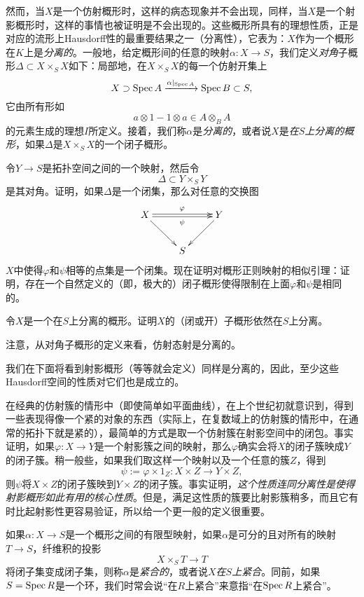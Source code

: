 然而，当$X$是一个仿射概形时，这样的病态现象并不会出现，同样，当$X$是一个射影概形时，这样的事情也被证明是不会出现的。这些概形所具有的理想性质，正是对应的流形上Hausdorff性的最重要结果之一（分离性），它表为：$X$作为一个概形在$K$上是\textit{分离的}。一般地，给定概形间的任意的映射$\alpha:X\to S$，我们定义\textit{对角}子概形$\Delta\subset X\times_S X$如下：局部地，在$X\times_S X$的每一个仿射开集上
\[
	X\supset \operatorname{Spec} A\xrightarrow{\alpha|_{\operatorname{Spec} A}}\operatorname{Spec} B\subset S,
\]
它由所有形如
\[
a\otimes 1 - 1\otimes a \in A\otimes_B A
\]
的元素生成的理想$I$所定义。接着，我们称$\alpha$是\textit{分离的}，或者说$X$是\textit{在$S$上分离的概形}，如果$\Delta$是$X\times_S X$的一个闭子概形。

\begin{exe}
令$Y\to S$是拓扑空间之间的一个映射，然后令
\[
	\Delta \subset Y\times_S Y
\]
是其对角。证明，如果$\Delta$是一个闭集，那么对任意的交换图
\[
	\xymatrix{
		X\ar@<0.3ex>[rr]^\varphi \ar@<-0.3ex>[rr]_\psi\ar[dr] &&Y\ar[ld]\\
		&S&
	}
\]
$X$中使得$\varphi$和$\psi$相等的点集是一个闭集。现在证明对概形正则映射的相似引理：证明，存在一个自然定义的（即，极大的）闭子概形使得限制在上面$\varphi$和$\psi$是相同的。
\end{exe}

\begin{exe}
	令$X$是一个在$S$上分离的概形。证明$X$的（闭或开）子概形依然在$S$上分离。
\end{exe}

\begin{exe}
	注意，从对角子概形的定义来看，仿射态射是分离的。
\end{exe}

我们在下面将看到射影概形（等等就会定义）同样是分离的，因此，至少这些Hausdorff空间的性质对它们也是成立的。

在经典的仿射簇的情形中（即使简单如平面曲线），在上个世纪初就意识到，得到一些表现得像一个紧的对象的东西（实际上，在复数域上的仿射簇的情形中，在通常的拓扑下就是紧的），最简单的方式是取一个仿射簇在射影空间中的闭包。事实证明，如果$\varphi:X\to Y$是一个射影簇之间的映射，那么$\varphi$确实会将$X$的闭子簇映成$Y$的闭子簇。稍一般些，如果我们取这样一个映射以及一个任意的簇$Z$，得到
\[
	\psi:=\varphi\times 1_Z:X\times Z\to Y\times Z,
\]
则$\psi$将$X\times Z$的闭子簇映到$Y\times Z$的闭子簇。事实证明，\textit{这个性质连同分离性是使得射影概形如此有用的核心性质}。但是，满足这性质的簇要比射影簇稍多，而且它有时比起射影性更容易验证，所以给一个更一般的定义很重要。

如果$\alpha:X\to S$是一个概形之间的有限型映射，如果$\alpha$是可分的且对所有的映射$T\to S$，纤维积的投影
\[
	X\times_S T\to T
\]
将闭子集变成闭子集，则称$\alpha$是\textit{紧合的}，或者说$X$\textit{在$S$上紧合}。同前，如果$S=\operatorname{Spec} R$是一个环，我们时常会说“在$R$上紧合”来意指“在$\operatorname{Spec} R$上紧合”。

